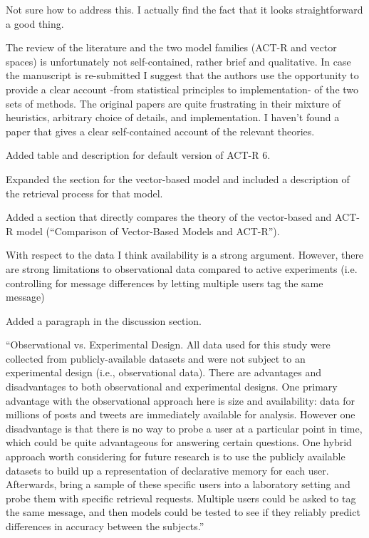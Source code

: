 \documentclass[answers,12pt]{exam}
\begin{document}
\begin{questions}
\begin{solution}
Not sure how to address this. I actually find the fact that it looks straightforward a good thing.
\end{solution}

\question The review of the literature and the two model families (ACT-R and vector spaces) is unfortunately not self-contained, rather brief and qualitative. In case the manuscript is re-submitted I suggest that the authors use the opportunity to provide a clear account -from statistical principles to implementation- of the two sets of methods. The original papers are quite frustrating in their mixture of heuristics, arbitrary choice of details, and implementation. I haven't found a paper that gives a clear self-contained account of the relevant theories.

\begin{solution}
Added table and description for default version of ACT-R 6.

Expanded the section for the vector-based model and included a description of the retrieval process for that model.

Added a section that directly compares the theory of the vector-based and ACT-R model (``Comparison of Vector-Based Models and ACT-R'').
\end{solution}

\question With respect to the data I think availability is a strong argument. However, there are strong limitations to observational data compared to active experiments (i.e. controlling for message differences by letting multiple users tag the same message)

\begin{solution}
Added a paragraph in the discussion section.
  
``Observational vs. Experimental Design. All data used for this study were collected from publicly-available datasets and were not subject to an experimental design
(i.e., observational data). There are advantages and disadvantages to both observational and experimental designs. One primary advantage with the observational approach here is size and availability: data for millions of posts and tweets are immediately available for analysis. However one disadvantage is that there is no way to probe a user at a particular point in time, which could be quite advantageous for answering certain questions. One hybrid approach worth considering for future research is to use the publicly available datasets to build up a representation of declarative memory for each user. Afterwards, bring a sample of these specific users into a laboratory setting and probe them with specific retrieval requests. Multiple users could be asked to tag the same message, and then models could be tested to see if they reliably predict differences in accuracy between the subjects.''
\end{solution}


\end{questions}
\end{document}
